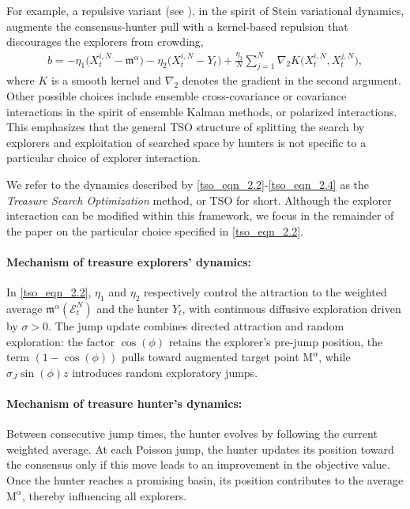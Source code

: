 \documentclass{article}
\def\m{\mathfrak{m}}
\numberwithin{equation}{section}
\begin{document}
For example, a repulsive variant (see \cite{hinds2025well}), in the spirit of Stein variational dynamics, augments the consensus-hunter pull with a kernel-based repulsion that discourages the explorers from crowding,
\begin{align}\label{tso_eqn_b_stein}
    b = -\eta_1\bigl(X_t^{i,N} - \m^\alpha\bigr) - \eta_2\bigl(X_t^{i,N} - Y_t\bigr) + \frac{\eta_3}{N}\sum_{j=1}^N \nabla_2 K\bigl(X_t^{i,N}, X_t^{j,N}\bigr),
\end{align}
where $K$ is a smooth kernel and $\nabla_2$ denotes the gradient in the second argument.
Other possible choices include ensemble cross-covariance or covariance interactions in the spirit of ensemble Kalman methods, or polarized interactions.  This emphasizes that the general TSO structure of splitting the search by explorers and exploitation of searched space by hunters is not specific to a particular choice of explorer interaction.


We refer to the dynamics described by \eqref{tso_eqn_2.2}-\eqref{tso_eqn_2.4} as the \textit{Treasure Search Optimization} method, or $\mathrm{TSO}$ for short. Although the explorer interaction can be modified within this framework,
we focus in the remainder of the paper on the particular choice specified in
\eqref{tso_eqn_2.2}.
\vspace{-10pt}
 \paragraph{Mechanism of treasure explorers' dynamics:}
 In \eqref{tso_eqn_2.2}, $\eta_1$ and $\eta_2$ respectively control the attraction to the weighted average $\mathfrak{m}^{\alpha}(\mathcal{E}^N_t)$ and the hunter $Y_t$, with continuous diffusive exploration driven by $\sigma>0$. 
 The jump update combines directed attraction and random exploration: the factor $\cos(\phi)$ retains the explorer's pre-jump position, the term $(1- \cos(\phi))$ pulls toward augmented target point $\mathrm{M}^\alpha$, while $\sigma_J \sin(\phi) z$ introduces random exploratory jumps.   
 \vspace{-10pt}
 \paragraph{Mechanism of treasure hunter's dynamics:}
Between consecutive jump times, the hunter evolves by following the current weighted average. At each Poisson jump, the hunter updates its position toward the consensus only if this move leads to an improvement in the objective value. Once the hunter reaches a promising basin, its position contributes to the average $\mathrm{M}^\alpha$, thereby influencing all explorers. 
\end{document}
